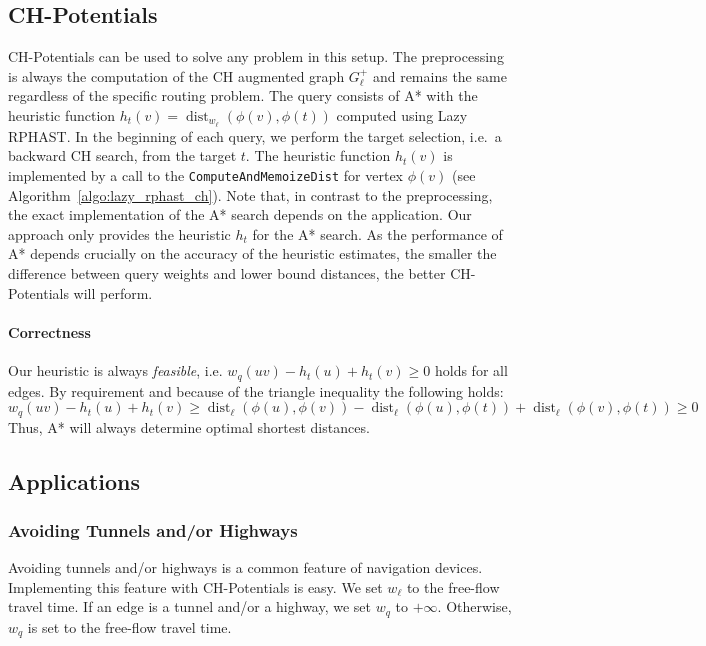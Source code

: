 \documentclass[manuscript,review]{acmart}
\newcommand*{\dist}{\operatorname{dist}}
\begin{document}
\subsection{CH-Potentials}\label{sec:chpot}
CH-Potentials can be used to solve any problem in this setup.
The preprocessing is always the computation of the CH augmented graph $G^+_{\ell}$ and remains the same regardless of the specific routing problem.
The query consists of A* with the heuristic function $h_t(v) = \dist_{w_{\ell}}(\phi(v), \phi(t))$ computed using Lazy RPHAST.
In the beginning of each query, we perform the target selection, i.e.\ a backward CH search, from the target $t$.
The heuristic function $h_t(v)$ is implemented by a call to the \texttt{ComputeAndMemoizeDist} for vertex $\phi(v)$ (see Algorithm~\ref{algo:lazy_rphast_ch}).
Note that, in contrast to the preprocessing, the exact implementation of the A* search depends on the application.
Our approach only provides the heuristic $h_t$ for the A* search.
As the performance of A* depends crucially on the accuracy of the heuristic estimates, the smaller the difference between query weights and lower bound distances, the better CH-Potentials will perform.

\paragraph{Correctness}
Our heuristic is always \emph{feasible}, i.e. $w_q(u v) - h_t(u) + h_t(v) \geq 0$ holds for all edges.
By requirement and because of the triangle inequality the following holds:
\[
w_q(u v) - h_t(u) + h_t(v) \geq \dist_\ell(\phi(u), \phi(v)) - \dist_\ell(\phi(u), \phi(t)) + \dist_\ell(\phi(v), \phi(t)) \geq 0
\]
Thus, A* will always determine optimal shortest distances.

\subsection{Applications}\label{sec:applications}
\subsubsection{Avoiding Tunnels and/or Highways}
\label{sec:no-tunnel-highway}

Avoiding tunnels and/or highways is a common feature of navigation devices.
Implementing this feature with CH-Potentials is easy.
We set $w_\ell$ to the free-flow travel time.
If an edge is a tunnel and/or a highway, we set $w_q$ to $+\infty$.
Otherwise, $w_q$ is set to the free-flow travel time.
\end{document}
